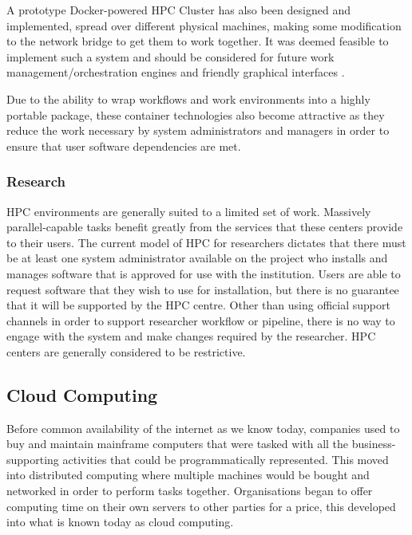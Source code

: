 A prototype Docker-powered HPC Cluster has also been designed and implemented, spread over different physical machines, making some modification to the network bridge to get them to work together. It was deemed feasible to implement such a system and should be considered for future work management/orchestration engines and friendly graphical interfaces \parencite{yu2015building}.

Due to the ability to wrap workflows and work environments into a highly portable package, these container technologies also become attractive as they reduce the work necessary by system administrators and managers in order to ensure that user software dependencies are met.

\subsubsection{Research}

HPC environments are generally suited to a limited set of work. Massively parallel-capable tasks benefit greatly from the services that these centers provide to their users. The current model of HPC for researchers dictates that there must be at least one system administrator available on the project who installs and manages software that is approved for use with the institution. Users are able to request software that they wish to use for installation, but there is no guarantee that it will be supported by the HPC centre. Other than using official support channels in order to support researcher workflow or pipeline, there is no way to engage with the system and make changes required by the researcher. HPC centers are generally considered to be restrictive.


\subsection{Cloud Computing}

Before common availability of the internet as we know today, companies used to buy and maintain mainframe computers that were tasked with all the business-supporting activities that could be programmatically represented. This moved into distributed computing where multiple machines would be bought and networked in order to perform tasks together. Organisations began to offer computing time on their own servers to other parties for a price, this developed into what is known today as cloud computing. 

